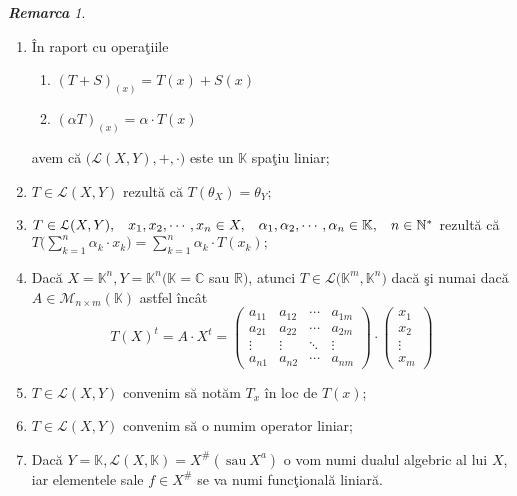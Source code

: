 \documentclass[ a4paper, 12pt]{report}
\theoremstyle{definition}
\theoremstyle{remark}
\newtheorem{remarc}{\bf Remarca}[section]
\numberwithin{equation}{section}
\begin{document}
\begin{remarc}
\begin{enumerate}
\item \^In raport cu opera\c tiile
\begin{enumerate}
\item $(T+S)_{(x)} = T(x) + S(x)$
\item $(\alpha T)_{(x)} = \alpha \cdot T(x)$
\end{enumerate} avem c\u a $\Big( \mathcal{L}(X,Y), + , \cdot\Big)$ este un $\mathbb{K}$ spa\c tiu liniar;
\item $T \in \mathcal{L}(X,Y)$ rezult\u a c\u a $T(\theta_{X}) = \theta_{Y};$
\item $T \in \mathcal{L}(X,Y),\hspace{3mm} x_1,x_2,\cdots,x_n \in X,\hspace{3mm} \alpha_1,\alpha_2, \cdots, \alpha_n \in \mathbb{K},\hspace{3mm} n \in \mathbb{N}^{\ast}$ rezult\u a c\u a $T\Big( \sum\limits_{k=1}^{n} \alpha_k \cdot x_k \Big) = \sum\limits_{k=1}^{n} \alpha_k \cdot T(x_k);$
\item Dac\u a $X = \mathbb{K}^{n}, Y = \mathbb{K}^{n} (\mathbb{K} = \mathbb{C}$ sau $\mathbb{R})$, atunci $T \in \mathcal{L}\Big( \mathbb{K}^{m}, \mathbb{K}^{n} \Big)$ dac\u a \c si numai dac\u a $A \in \mathcal{M}_{n \times m}(\mathbb{K})$ astfel \^inc\^at
\[ T(X)^{t} = A \cdot X^{t} = \begin{pmatrix}
  a_{11} & a_{12} & \cdots & a_{1m} \\
  a_{21} & a_{22} & \cdots & a_{2m} \\
  \vdots  & \vdots  & \ddots & \vdots  \\
  a_{n1} & a_{n2} & \cdots & a_{nm}
 \end{pmatrix} \cdot \begin{pmatrix}
 x_1\\
 x_2\\
 \vdots\\
 x_m
 \end{pmatrix}
\]
\item $T \in \mathcal{L}(X,Y)$ convenim s\u a not\u am $T_{x}$ \^in loc de $T(x)$;
\item $T \in \mathcal{L}(X,Y)$ convenim s\u a o numim operator liniar;
\item Dac\u a $Y = \mathbb{K},  \mathcal{L}(X,\mathbb{K}) = X^{\#} (\ \mbox{sau}\ X^{a})$ o vom numi dualul algebric al lui $X$, iar elementele sale $f \in X^{\#}$ se va numi func\c tional\u a liniar\u a.
\end{enumerate}

\end{remarc}
\end{document}
